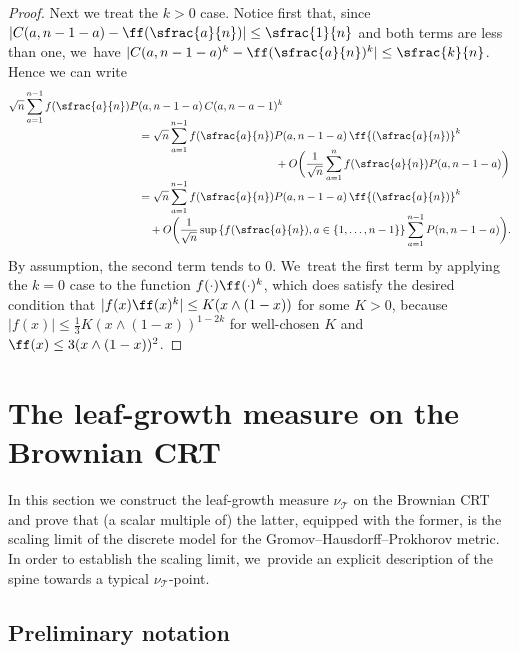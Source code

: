 \documentclass[JEP,XML,SOM,Unicode,NoFloatCountersInSection, NoEqCountersInSection,published]{cedram}
\theoremstyle{definition}
\begin{document}
\begin{proof}
Next we treat the $k>0$ case. Notice first that, since $|C(a,n-1-a)-\ff(\sfrac{a}{n})|\leq \sfrac{1}{n}$ and both terms are less than one, we~have $|C(a,n-1-a)^k-\ff(\sfrac{a}{n})^k|\leq \sfrac{k}{n}$. Hence we can write\vspace*{-3pt}
\begin{align*}
\sqrt{n} \sum_{a=1}^{n-1} f{(\sfrac{a}{n})}P&(a,n-1-a)\,C(a,n-a-1)^k\\[
-8pt]
&=\sqrt{n}\sum_{a=1}^{n-1} f{(\sfrac{a}{n})}P(a,n-1-a)\,\ff{(\sfrac{a}{n})}^k\\[-8pt]
&\quad\hspace*{4cm}+O\biggl(\frac1{\sqrt{n}}\sum_{a=1}^n f{(\sfrac{a}{n})}P(a,n-1-a)\biggr) \\[-5pt]
&=\sqrt{n}\sum_{a=1}^{n-1} f{(\sfrac{a}{n})}P(a,n-1-a)\,\ff{(\sfrac{a}{n})}^k\\[-5pt]
&\quad+ O\biggl(\frac1{\sqrt{n}}\sup\left\{f{(\sfrac{a}{n})},a\in\{1,\ldots,n-1\}\right\}\sum_{a=1}^{n-1}P(n,n-1-a)\biggr).
\end{align*}
By assumption, the second term tends to $0$. We~treat the first term by applying the $k=0$ case to the function $f(\cdot)\ff(\cdot)^k$, which does satisfy the desired condition that $|f(x)\ff(x)^k| \leq K(x\wedge (1-x))$ for some $K>0$, because $|f(x)|\leq \frac13K(x\wedge(1-x))^{1-2k}$ for well-chosen $K$ and $\ff(x) \leq 3 (x\wedge (1-x))^2$.
\end{proof}

\section{The leaf-growth measure on the Brownian CRT}\label{section:convergence}

In this section we construct the leaf-growth measure $\nu_\mathcal{T}$ on the Brownian CRT and prove that (a scalar multiple of) the latter, equipped with the former, is the scaling limit of the discrete model for the Gromov--Hausdorff--Prokhorov metric. In order to establish the scaling limit, we~provide an explicit description of the spine towards a typical $\nu_\mathcal{T}$-point.

\subsection{Preliminary notation}
\end{document}
